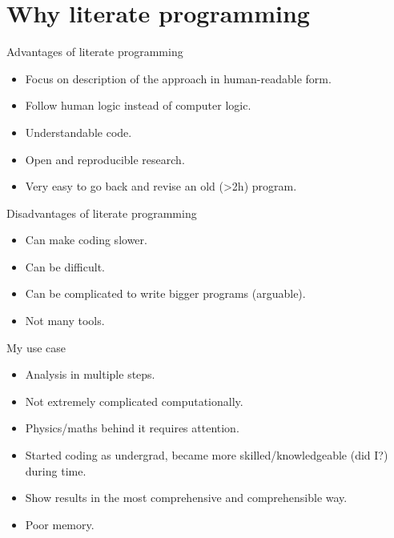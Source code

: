 \documentclass{Gesue_PresentationTemplate}
\begin{document}
\section{Why literate programming}
\begin{frame}{Advantages of literate programming}
  \begin{itemize}
    \item Focus on \alert{description} of the
          approach in human-readable form.
    \item Follow \alert{human logic} instead of
          computer logic.
    \item \alert{Understandable} code.
    \item \alert{Open and reproducible
          research}\cite{reproducibleresearch}.
    \item Very easy to go back and \alert{revise}
          an old (>2h) program.
  \end{itemize}
\end{frame}
\begin{frame}{Disadvantages of literate programming}
  \begin{itemize}
    \item Can make coding slower.
    \item Can be difficult.
    \item Can be complicated to write bigger
          programs (arguable).
    \item Not many tools.
  \end{itemize}
\end{frame}
\begin{frame}{My use case}
  \begin{itemize}
    \item Analysis in multiple steps.
    \item Not extremely complicated
          computationally.
    \item Physics/maths behind it requires
          attention.
    \item Started coding as undergrad, became more
          skilled/knowledgeable (did I?)
          during time.
    \item Show results in the most comprehensive
          and comprehensible way.
    \item \alert{Poor memory}.
  \end{itemize}
\end{frame}
\end{document}
